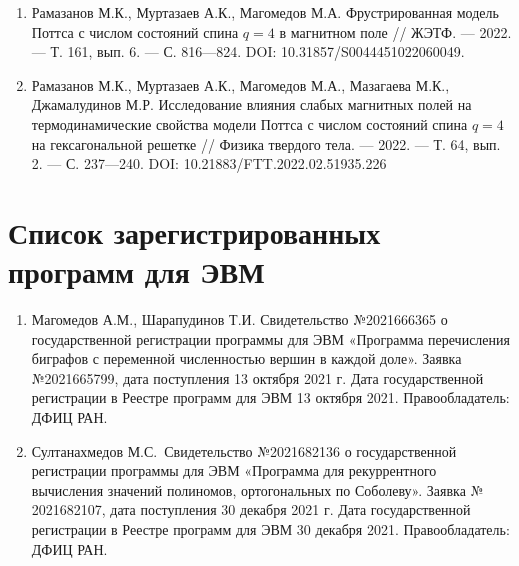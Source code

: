 \begin{enumerate}[1]
    \item
    Рамазанов М.К., Муртазаев А.К., Магомедов М.А. Фрустрированная модель Поттса с числом состояний спина $q = 4$ в магнитном поле // ЖЭТФ.
    --- 2022.
    --- Т. 161, вып. 6.
    --- С. 816---824. DOI: 10.31857/S0044451022060049.
    
    \item
    Рамазанов М.К., Муртазаев А.К., Магомедов М.А., Мазагаева М.К., Джамалудинов М.Р. Исследование влияния слабых магнитных полей на термодинамические свойства модели Поттса с числом состояний спина $q = 4$ на гексагональной решетке // Физика твердого тела. 
    --- 2022.
    --- Т. 64, вып. 2.
    --- С. 237---240. DOI: 10.21883/FTT.2022.02.51935.226

\end{enumerate}

\section*{Список зарегистрированных программ для ЭВМ}

\begin{enumerate}[1]
    \item
    Магомедов А.М., Шарапудинов Т.И. Свидетельство №2021666365 о государственной регистрации программы для ЭВМ «Программа перечисления биграфов с переменной численностью вершин в каждой доле». Заявка №2021665799, дата поступления 13 октября 2021 г. Дата государственной регистрации в Реестре программ для ЭВМ 13 октября 2021. Правообладатель: ДФИЦ РАН.
    
    \item
    Султанахмедов М.С.~Свидетельство №2021682136 о государственной регистрации программы для ЭВМ «Программа для рекуррентного вычисления значений полиномов, ортогональных по Соболеву». Заявка № 2021682107, дата поступления 30 декабря 2021 г. Дата государственной регистрации в Реестре программ для ЭВМ 30 декабря 2021. Правообладатель: ДФИЦ РАН.
\end{enumerate}

